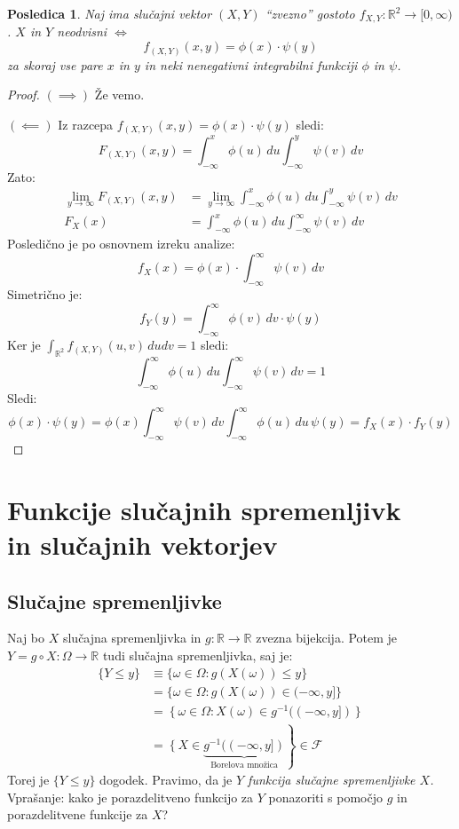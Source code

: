 \documentclass[12pt]{book}
\def\n{\noindent}
\theoremstyle{definition}
\theoremstyle{plain}
\theoremstyle{plain}
\theoremstyle{plain}
\theoremstyle{plain}
\newtheorem{posledica}{Posledica}
\theoremstyle{remark}
\begin{document}
\begin{posledica}
    Naj ima slučajni vektor $(X,Y)$ “zvezno” gostoto $f_{X,Y}: \mathbb{R}^2 \to [0, \infty)$. $X$ in $Y$ neodvisni $\iff$
    $$
    f_{(X, Y)}(x, y)=\phi(x) \cdot \psi(y)
    $$
    za skoraj vse pare $x$ in $y$ in neki nenegativni integrabilni funkciji $\phi$ in $\psi$.
\end{posledica}

\begin{proof}
    $(\implies)$ Že vemo. 

    \n $(\impliedby)$ Iz razcepa $f_{(X, Y)}(x, y)=\phi(x) \cdot \psi(y)$ sledi: 
    $$
    F_{(X, Y)}(x, y)=\int_{-\infty}^x \phi(u) \, d u \int_{-\infty}^y \psi(v) \, d v
    $$
    Zato: 
    $$
    \begin{aligned}
        \lim_{y \to \infty} F_{(X,Y)}(x,y) &= \lim_{y \to \infty} \int_{-\infty}^x \phi(u) \, d u \int_{-\infty}^y \psi(v) \, d v \\
        F_X(x)&=\int_{-\infty}^x \phi(u) \, d u \int_{-\infty}^{\infty} \psi(v) \, d v
    \end{aligned}
    $$
    Posledično je po osnovnem izreku analize: 
    $$
    f_X(x)=\phi(x) \cdot \int_{-\infty}^{\infty} \psi(v) \, d v
    $$
    Simetrično je: 
    $$
    f_Y(y)=\int_{-\infty}^{\infty} \phi(v) \, d v  \cdot \psi(y)
    $$
    Ker je $\int_{\mathbb{R}^2} f_{(X, Y)}(u, v) \, d u d v=1$ sledi:
    $$
    \int_{-\infty}^{\infty} \phi(u) \, d u \int_{-\infty}^{\infty} \psi(v) \, d v=1
    $$
    Sledi: 
    $$
    \phi(x) \cdot \psi(y)=\phi(x) \int_{-\infty}^{\infty} \psi(v) \, d v  \int_{-\infty}^{\infty} \phi(u) \, d u \, \psi(y)=f_X(x) \cdot f_Y(y)
    $$
\end{proof}

\chapter[Funkcije slučajnih spremenljivk in slučajnih vektorjev]{Funkcije slučajnih spremenljivk \\ in slučajnih vektorjev}

\section{Slučajne spremenljivke}

Naj bo $X$ slučajna spremenljivka in $g: \mathbb{R} \to \mathbb{R}$ zvezna bijekcija. Potem je $Y= g \circ X: \Omega \rightarrow \mathbb{R}$ tudi slučajna spremenljivka, saj je:
$$
\begin{aligned}
    \{Y \leq y\} &\equiv\{\omega \in \Omega: g(X(\omega)) \leq y\} \\
    & =\{\omega \in \Omega: g(X(\omega)) \in(-\infty, y]\} \\
    & =\left\{\omega \in \Omega: \right. X(\omega) \in g^{-1} \left. ((-\infty, y])\right\} \\
    & =\left\{X \in \right. \underbrace{g^{-1}((-\infty, y])}_{\text{Borelova množica}}\left. \right\} \in \mathcal{F}
\end{aligned}
$$
Torej je $\{Y \leq y\}$ dogodek. Pravimo, da je \emph{$Y$ funkcija slučajne spremenljivke $X$.} Vprašanje: kako je porazdelitveno funkcijo za $Y$ ponazoriti s pomočjo $g$ in porazdelitvene funkcije za $X$? 
\end{document}
